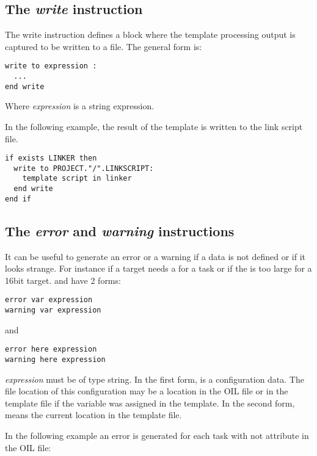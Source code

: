 \subsection{The {\em write} instruction}

The write instruction defines a block where the template processing output is captured to be written to a file. The general form is:

\begin{lstlisting}
write to expression :
  ...
end write
\end{lstlisting}

Where {\em expression} is a string expression.

In the following example, the result of the  template is written to the link script file.

\begin{lstlisting}
if exists LINKER then
  write to PROJECT."/".LINKSCRIPT:
    template script in linker
  end write
end if
\end{lstlisting}


\subsection{The {\em error} and {\em warning} instructions}

It can be useful to generate an error or a warning if a data is not defined or if it looks strange. For instance if a target needs a  for a task or if the  is too large for a 16bit target.  and  have 2 forms:

\begin{lstlisting}
error var expression
warning var expression
\end{lstlisting}

and

\begin{lstlisting}
error here expression
warning here expression
\end{lstlisting}

{\em expression} must be of type string. In the first form,  is a configuration data. The file location of this configuration may be a location in the OIL file or in the template file if the variable was assigned in the template. In the second form,  means the current location in the template file.

In the following example an error is generated for each task with not  attribute in the OIL file:

